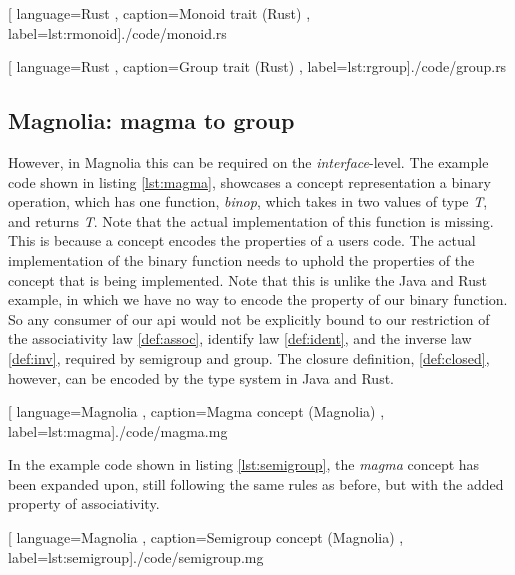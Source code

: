 \begin{center}
  
    [ language=Rust
    , caption={Monoid trait (Rust)}
    , label=lst:rmonoid]{./code/monoid.rs}
\end{center}

\begin{center}
  
    [ language=Rust
    , caption={Group trait (Rust)}
    , label=lst:rgroup]{./code/group.rs}
\end{center}

\subsection{Magnolia: magma to group}

However, in Magnolia this can be required on the \textit{interface}-level. The
example code shown in listing \ref{lst:magma}, showcases a concept
representation a binary operation, which has one function, \textit{binop}, which
takes in two values of type \textit{T}, and returns \textit{T}. Note that the
actual implementation of this function is missing. This is because a concept
encodes the properties of a users code. The actual implementation of the
binary function needs to uphold the properties of the concept that is
being implemented. Note that this is unlike the Java and Rust example, in
which we have no way to encode the property of our binary function. So any
consumer of our \gls*{api} would not be explicitly bound to our restriction of
the associativity law \ref{def:assoc}, identify law \ref{def:ident}, and the
inverse law \ref{def:inv}, required by semigroup and group. The closure
definition, \ref{def:closed}, however, can be encoded by the type system in Java
and Rust.

\begin{center}
  
    [ language=Magnolia
    , caption={Magma concept (Magnolia)}
    , label=lst:magma]{./code/magma.mg}
\end{center}

In the example code shown in listing \ref{lst:semigroup}, the \textit{magma}
concept has been expanded upon, still following the same rules as before, but
with the added property of associativity.

\begin{center}
  
    [ language=Magnolia
    , caption={Semigroup concept (Magnolia)}
    , label=lst:semigroup]{./code/semigroup.mg}
\end{center}

